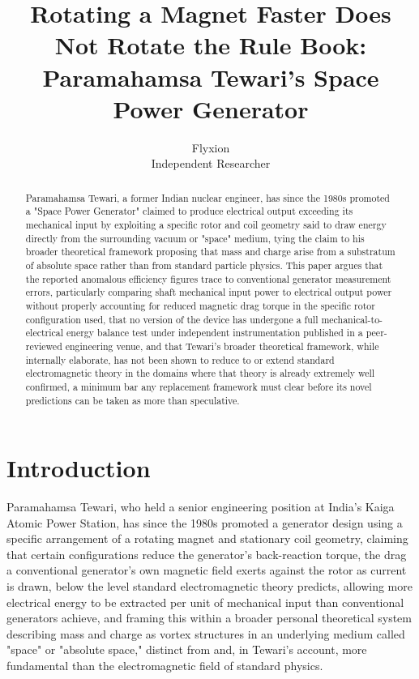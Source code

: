 \documentclass[11pt]{article}
\title{Rotating a Magnet Faster Does Not Rotate the Rule Book: Paramahamsa Tewari's Space Power Generator}
\author{Flyxion \\ \small Independent Researcher}
\date{}
\begin{document}
\maketitle

\begin{abstract}
Paramahamsa Tewari, a former Indian nuclear engineer, has since the 1980s promoted a "Space Power Generator" claimed to produce electrical output exceeding its mechanical input by exploiting a specific rotor and coil geometry said to draw energy directly from the surrounding vacuum or "space" medium, tying the claim to his broader theoretical framework proposing that mass and charge arise from a substratum of absolute space rather than from standard particle physics. This paper argues that the reported anomalous efficiency figures trace to conventional generator measurement errors, particularly comparing shaft mechanical input power to electrical output power without properly accounting for reduced magnetic drag torque in the specific rotor configuration used, that no version of the device has undergone a full mechanical-to-electrical energy balance test under independent instrumentation published in a peer-reviewed engineering venue, and that Tewari's broader theoretical framework, while internally elaborate, has not been shown to reduce to or extend standard electromagnetic theory in the domains where that theory is already extremely well confirmed, a minimum bar any replacement framework must clear before its novel predictions can be taken as more than speculative.
\end{abstract}

\section{Introduction}

Paramahamsa Tewari, who held a senior engineering position at India's Kaiga Atomic Power Station, has since the 1980s promoted a generator design using a specific arrangement of a rotating magnet and stationary coil geometry, claiming that certain configurations reduce the generator's back-reaction torque, the drag a conventional generator's own magnetic field exerts against the rotor as current is drawn, below the level standard electromagnetic theory predicts, allowing more electrical energy to be extracted per unit of mechanical input than conventional generators achieve, and framing this within a broader personal theoretical system describing mass and charge as vortex structures in an underlying medium called "space" or "absolute space," distinct from and, in Tewari's account, more fundamental than the electromagnetic field of standard physics.
\end{document}
